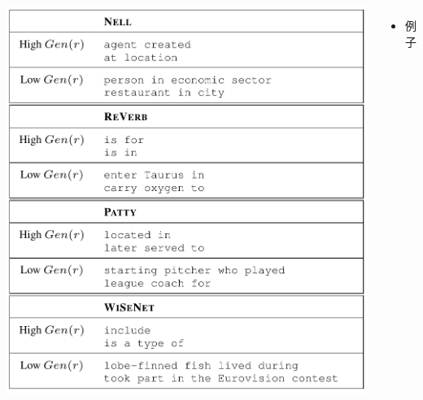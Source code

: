 \documentclass[xcolor=svgnames,dvipsnames,table, hyperref=pdftex, mathserif, presentation]{beamer}
\begin{document}
{{\begin{columns}
\begin{center}
     \includegraphics[width=0.8\hsize]{pic/relationExp.png}
    \end{center}
    \column{0.4\hsize}
    \begin{itemize}
     \item 例子
    \end{itemize}
   \end{columns}
   }
}
\end{document}
